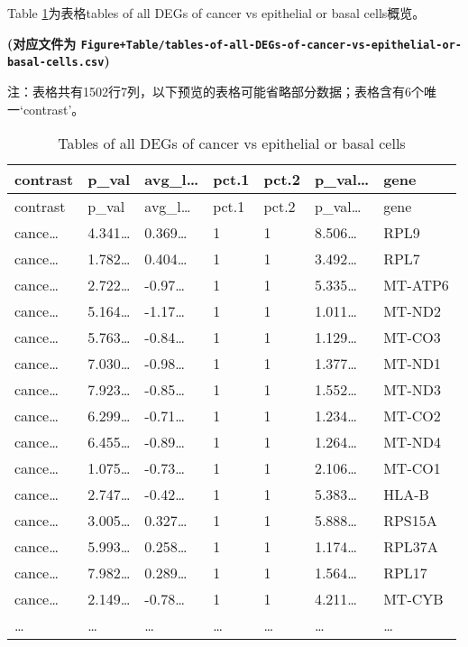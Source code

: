 \documentclass[
]{article}
\begin{document}
Table \ref{tab:tables-of-all-DEGs-of-cancer-vs-epithelial-or-basal-cells}为表格tables of all DEGs of cancer vs epithelial or basal cells概览。

\textbf{(对应文件为 \texttt{Figure+Table/tables-of-all-DEGs-of-cancer-vs-epithelial-or-basal-cells.csv})}

\begin{center}\begin{tcolorbox}[colback=gray!10, colframe=gray!50, width=0.9\linewidth, arc=1mm, boxrule=0.5pt]注：表格共有1502行7列，以下预览的表格可能省略部分数据；表格含有6个唯一`contrast'。
\end{tcolorbox}
\end{center}

\begin{longtable}[]{@{}lllllll@{}}
\caption{\label{tab:tables-of-all-DEGs-of-cancer-vs-epithelial-or-basal-cells}Tables of all DEGs of cancer vs epithelial or basal cells}\tabularnewline
\toprule
contrast & p\_val & avg\_l\ldots{} & pct.1 & pct.2 & p\_val\ldots{} & gene\tabularnewline
\midrule
\endfirsthead
\toprule
contrast & p\_val & avg\_l\ldots{} & pct.1 & pct.2 & p\_val\ldots{} & gene\tabularnewline
\midrule
\endhead
cance\ldots{} & 4.341\ldots{} & 0.369\ldots{} & 1 & 1 & 8.506\ldots{} & RPL9\tabularnewline
cance\ldots{} & 1.782\ldots{} & 0.404\ldots{} & 1 & 1 & 3.492\ldots{} & RPL7\tabularnewline
cance\ldots{} & 2.722\ldots{} & -0.97\ldots{} & 1 & 1 & 5.335\ldots{} & MT-ATP6\tabularnewline
cance\ldots{} & 5.164\ldots{} & -1.17\ldots{} & 1 & 1 & 1.011\ldots{} & MT-ND2\tabularnewline
cance\ldots{} & 5.763\ldots{} & -0.84\ldots{} & 1 & 1 & 1.129\ldots{} & MT-CO3\tabularnewline
cance\ldots{} & 7.030\ldots{} & -0.98\ldots{} & 1 & 1 & 1.377\ldots{} & MT-ND1\tabularnewline
cance\ldots{} & 7.923\ldots{} & -0.85\ldots{} & 1 & 1 & 1.552\ldots{} & MT-ND3\tabularnewline
cance\ldots{} & 6.299\ldots{} & -0.71\ldots{} & 1 & 1 & 1.234\ldots{} & MT-CO2\tabularnewline
cance\ldots{} & 6.455\ldots{} & -0.89\ldots{} & 1 & 1 & 1.264\ldots{} & MT-ND4\tabularnewline
cance\ldots{} & 1.075\ldots{} & -0.73\ldots{} & 1 & 1 & 2.106\ldots{} & MT-CO1\tabularnewline
cance\ldots{} & 2.747\ldots{} & -0.42\ldots{} & 1 & 1 & 5.383\ldots{} & HLA-B\tabularnewline
cance\ldots{} & 3.005\ldots{} & 0.327\ldots{} & 1 & 1 & 5.888\ldots{} & RPS15A\tabularnewline
cance\ldots{} & 5.993\ldots{} & 0.258\ldots{} & 1 & 1 & 1.174\ldots{} & RPL37A\tabularnewline
cance\ldots{} & 7.982\ldots{} & 0.289\ldots{} & 1 & 1 & 1.564\ldots{} & RPL17\tabularnewline
cance\ldots{} & 2.149\ldots{} & -0.78\ldots{} & 1 & 1 & 4.211\ldots{} & MT-CYB\tabularnewline
\ldots{} & \ldots{} & \ldots{} & \ldots{} & \ldots{} & \ldots{} & \ldots{}\tabularnewline
\bottomrule
\end{longtable}
\end{document}
